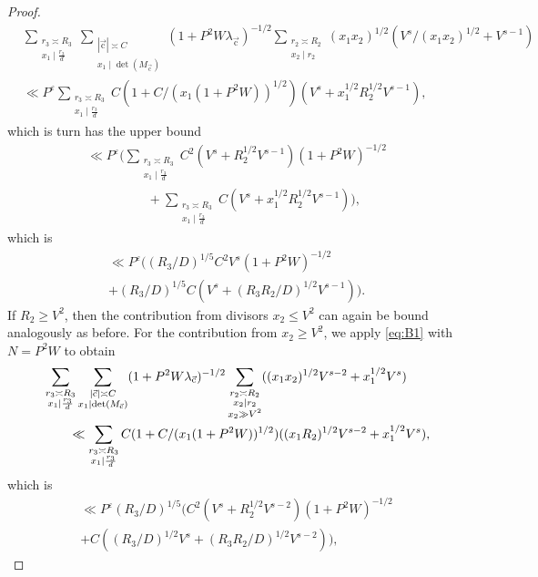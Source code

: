 \documentclass[letterpaper,11pt]{amsart}
\numberwithin{equation}{section}
\theoremstyle{definition}
\numberwithin{equation}{section}
\newcommand{\uc}{{\vec{\mathrm{c}}}}
\newcommand{\ve}{\varepsilon}
\begin{document}
\begin{proof}
\begin{align*}
&\sum_{\substack{r_3\asymp R_3\\ x_1\mid \frac{r_3}{d}}}\sum_{\substack{|\uc|\asymp C\\ x_1\mid \det(M_\uc) }}(1+P^2W\lambda_\uc)^{-1/2}\sum_{\substack{r_2\asymp R_2\\ x_2\mid r_2}} (x_1x_2)^{1/2}(V^s/(x_1x_2)^{1/2}+V^{s-1})\\
&\ll P^{\ve} \sum_{\substack{r_3\asymp R_3\\ x_1\mid \frac{r_3}{d}}}C(1+C/(x_1(1+P^2W))^{1/2})(V^s+x_1^{1/2}R_2^{1/2}V^{s-1}),
\end{align*}
which is turn has the upper bound
\begin{multline*}
\ll P^{\ve} \Big(\sum_{\substack{r_3\asymp R_3\\ x_1\mid \frac{r_3}{d}}}C^2(V^s+R_2^{1/2}V^{s-1})(1+P^2W)^{-1/2}
\\  \hspace{2cm} +\sum_{\substack{r_3\asymp R_3\\ x_1\mid \frac{r_3}{d}}}C(V^s+x_1^{1/2}R_2^{1/2}V^{s-1})\Big),
\end{multline*}
which is
\begin{multline}
    \ll P^{\ve}\Big((R_3/D)^{1/5}C^2V^s(1+P^2W)^{-1/2} \\
    +(R_3/D)^{1/5}C(V^s+(R_3R_2/D)^{1/2}V^{s-1})\Big). \label{R2<V^2}
\end{multline}
If $R_2\geq V^2$, then the contribution from divisors $x_2\leq V^2$ can again be bound analogously as before. For the contribution from $x_2\geq V^2$, we apply \eqref{eq:B1} with $N=P^2W$ to obtain
 \begin{align*}
\MoveEqLeft\sum_{\substack{r_3\asymp R_3\\ x_1\mid \frac{r_3}{d}}}\sum_{\substack{|\uc|\asymp C\\ x_1\mid \det(M_\uc) }}(1+P^2W\lambda_\uc)^{-1/2}\sum_{\substack{r_2\asymp R_2\\ x_2\mid r_2\\ x_2\gg V^2}} ((x_1x_2)^{1/2}V^{s-2}+x_1^{1/2}V^{s})\\
&\ll\sum_{\substack{r_3\asymp R_3\\ x_1\mid \frac{r_3}{d}}}C(1+C/(x_1(1+P^2W))^{1/2})((x_1R_2)^{1/2}V^{s-2}+x_1^{1/2}V^{s}),
\end{align*}
which is
\begin{multline*}
    \ll P^{\ve}(R_3/D)^{1/5}\Big(C^2(V^s+R_2^{1/2}V^{s-2})(1+P^2W)^{-1/2}\\ +C((R_3/D)^{1/2}V^s+(R_3R_2/D)^{1/2}V^{s-2})\Big),

\end{multline*}
\end{proof}
\end{document}
